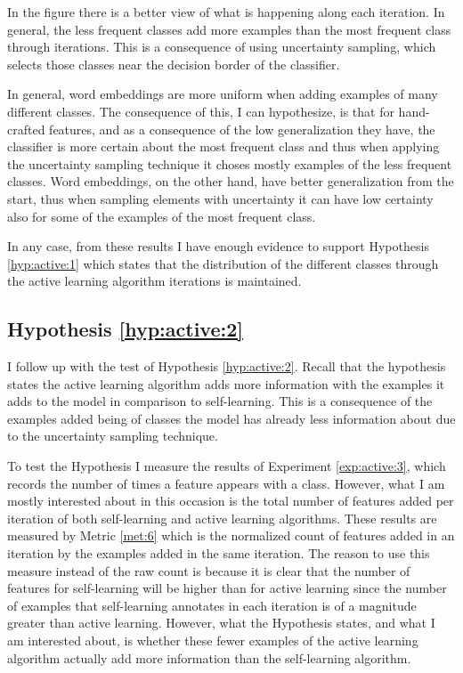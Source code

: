 In the figure there is a better view of what is happening along each iteration.
In general, the less frequent classes add more examples than the most frequent
class through iterations. This is a consequence of using uncertainty sampling,
which selects those classes near the decision border of the classifier.

In general, word embeddings are more uniform when adding examples of many
different classes. The consequence of this, I can hypothesize, is that for
hand-crafted features, and as a consequence of the low generalization they
have, the classifier is more certain about the most frequent class and thus
when applying the uncertainty sampling technique it choses mostly examples of
the less frequent classes. Word embeddings, on the other hand, have better
generalization from the start, thus when sampling elements with uncertainty it
can have low certainty also for some of the examples of the most frequent
class.

In any case, from these results I have enough evidence to support Hypothesis
\ref{hyp:active:1} which states that the distribution of the different classes
through the active learning algorithm iterations is maintained.

\subsection{Hypothesis \ref{hyp:active:2}}\label{sec:active:hyp:2}

I follow up with the test of Hypothesis \ref{hyp:active:2}. Recall that the
hypothesis states the active learning algorithm adds more information with the
examples it adds to the model in comparison to self-learning. This is a
consequence of the examples added being of classes the model has already less
information about due to the uncertainty sampling technique.

To test the Hypothesis I measure the results of Experiment \ref{exp:active:3},
which records the number of times a feature appears with a class. However, what
I am mostly interested about in this occasion is the total number of features
added per iteration of both self-learning and active learning algorithms. These
results are measured by Metric \ref{met:6} which is the normalized count of
features added in an iteration by the examples added in the same iteration.
The reason to use this measure instead of the raw count is because it is clear
that the number of features for self-learning will be higher than for active
learning since the number of examples that self-learning annotates in each
iteration is of a magnitude greater than active learning. However, what the
Hypothesis states, and what I am interested about, is whether these fewer
examples of the active learning algorithm actually add more information than
the self-learning algorithm.

